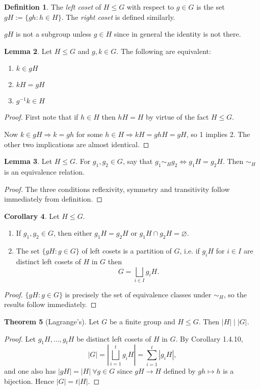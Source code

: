 \documentclass[a4paper]{article}
\theoremstyle{definition}
\newtheorem{defn}{Definition}[subsection]
\newtheorem{thm}[defn]{Theorem}
\newtheorem{lemma}[defn]{Lemma}
\newtheorem{coro}[defn]{Corollary}
\begin{document}
\begin{defn}
The \textit{left coset} of $H\leq G$ with respect to $g\in G$ is the set $gH:=\{gh:h\in H\}.$ The \textit{right coset} is defined similarly.
\end{defn}
$gH$ is not a subgroup unless $g\in H$ since in general the identity is not there.
\begin{lemma}
Let $H\leq G$ and $g,k\in G$. The following are equivalent:
\begin{enumerate}
\item $k\in gH$
\item $kH=gH$
\item $g^{-1}k\in H$
\end{enumerate}
\end{lemma}
\begin{proof}
First note that if $h\in H$ then $hH=H$ by virtue of the fact $H\leq G$.

Now $k\in gH\Rightarrow k=gh$ for some $h\in H \Rightarrow kH=ghH=gH$, so 1 implies 2. The other two implications are almost identical.
\end{proof}
\begin{lemma}
Let $H\leq G$. For $g_1,g_2\in G$, say that $g_1\sim_H g_2\Leftrightarrow g_1H=g_2H$. Then $\sim_H$ is an equivalence relation.
\end{lemma}
\begin{proof}
The three conditions reflexivity, symmetry and transitivity follow immediately from definition.
\end{proof}
\begin{coro}
Let $H\leq G$.
\begin{enumerate}
\item If $g_1,g_2\in G$, then either $g_1H=g_2H$ or $g_1H\cap g_2 H=\varnothing$.
\item The set $\{gH:g\in G\}$ of left cosets is a partition of $G$, i.e. if $g_iH$ for $i\in I$ are distinct left cosets of $H$ in $G$ then
\[
G=\bigsqcup_{i\in I} g_i H.
\]
\end{enumerate}
\end{coro}
\begin{proof}
$\{gH:g\in G\}$ is precisely the set of equivalence classes under $\sim_H$, so the results follow immediately.
\end{proof}
\begin{thm}[Lagrange's]
Let $G$ be a finite group and $H\leq G$. Then $|H|\mid |G|$.
\end{thm}
\begin{proof}
Let $g_1H,\ldots,g_tH$ be distinct left cosets of $H$ in $G$. By Corollary 1.4.10,
\[
|G|=\left|\bigsqcup_{i=1}^t g_i H\right|=\sum_{i=1}^t |g_iH|,
\]
and one also has $|gH|=|H| \ \forall g\in G$ since $gH\rightarrow H$ defined by $gh\mapsto h$ is a bijection. Hence $|G|=t|H|$.
\end{proof}
\end{document}
